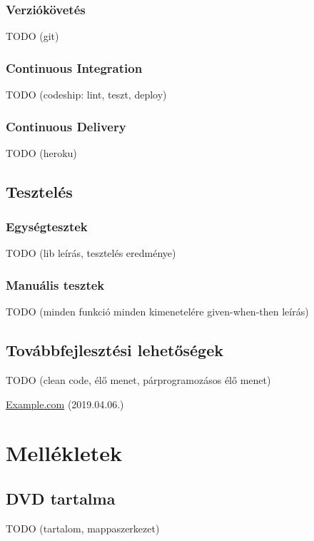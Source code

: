 \documentclass{elteikthesis}
\begin{document}
	\subsection{Verziókövetés}
	TODO (git)
	
	\subsection{Continuous Integration}
	TODO (codeship: lint, teszt, deploy)
	
	\subsection{Continuous Delivery}
	TODO (heroku)
	
	\section{Tesztelés}
	\subsection{Egységtesztek}
	TODO (lib leírás, tesztelés eredménye)
	
	\subsection{Manuális tesztek}
	TODO (minden funkció minden kimenetelére given-when-then leírás)
	
	\section{Továbbfejlesztési lehetőségek}
	TODO (clean code, élő menet, párprogramozásos élő menet)

	\begin{thebibliography}{99}

		\href{http://example.com}{Example.com} (2019.04.06.)
	\end{thebibliography}
	
	\chapter*{Mellékletek}
	\section*{DVD tartalma}
	TODO (tartalom, mappaszerkezet)
\end{document}
